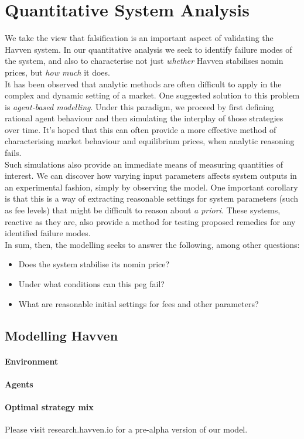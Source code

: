 \section{Quantitative System Analysis}

We take the view that falsification is an important aspect of validating
the Havven system. In our quantitative analysis we seek to identify failure modes
of the system, and also to characterise not just \textit{whether} Havven stabilises
nomin prices, but \textit{how much} it does. \\

\noindent It has been observed that analytic methods are often difficult to
apply in the complex and dynamic setting of a market.
One suggested solution to this problem is \textit{agent-based modelling}.
Under this paradigm, we proceed by first defining rational agent behaviour
and then simulating the interplay of those strategies over time.
It's hoped that this can often provide a more effective
method of characterising market behaviour and equilibrium prices,
when analytic reasoning fails.~\cite{poggio2001agent}\\

\noindent Such simulations also provide an immediate means of measuring
quantities of interest. We can discover how varying input parameters
affects system outputs in an experimental fashion, simply by observing
the model.
One important corollary is that this is a way of extracting reasonable
settings for system parameters (such as fee levels) that might be difficult
to reason about \textit{a priori}. These systems, reactive as they are,
also provide a method for testing proposed remedies for any identified failure
modes. \\

\noindent In sum, then, the modelling seeks to answer the following, among
other questions:

\begin{itemize}
    \item Does the system stabilise its nomin price?
    \item Under what conditions can this peg fail?
    \item What are reasonable initial settings for fees and other parameters?
\end{itemize}

\subsection{Modelling Havven}

\paragraph{Environment}

\paragraph{Agents}

\paragraph{Optimal strategy mix}

Please visit research.havven.io for a pre-alpha version of our model.

\pagebreak
